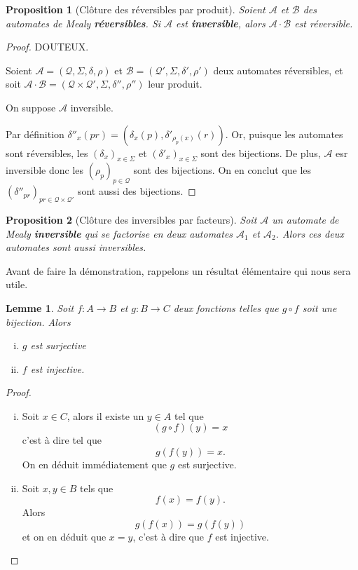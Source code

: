 \documentclass[11pt,a4paper]{article}
\newtheorem{prop}{Proposition}
\newtheorem{lemma}{Lemme}
\begin{document}
\begin{prop}[Clôture des réversibles par produit]
  Soient $\mathcal{A}$ et $\mathcal{B}$ des automates de Mealy \textbf{réversibles}. Si $\mathcal{A}$ est \textbf{inversible}, alors $\mathcal{A}\cdot\mathcal{B}$ est réversible.
\end{prop}

\begin{proof}
  DOUTEUX.


  Soient $\mathcal{A}=\left(\mathcal{Q}, \Sigma, \delta, \rho\right)$ et $\mathcal{B}=\left(\mathcal{Q'}, \Sigma, \delta', \rho'\right)$ deux automates réversibles, et soit $\mathcal{A\cdot B}=\left(\mathcal{Q\times Q'}, \Sigma, \delta'', \rho''\right)$ leur produit.


  On suppose $\mathcal{A}$ inversible.


  Par définition $\delta''_x(pr)=(\delta_x(p), \delta'_{\rho_p(x)}(r))$. Or, puisque les automates sont réversibles, les $(\delta_x)_{x\in\Sigma}$ et ${(\delta'_x)}_{x\in\Sigma}$ sont des bijections. De plus, $\mathcal{A}$ esr inversible donc les ${(\rho_p)}_{p\in \mathcal{Q}}$ sont des bijections. On en conclut que les ${(\delta''_{pr})}_{pr\in\mathcal{Q}\times\mathcal{Q'}}$ sont aussi des bijections.
\end{proof}

\begin{prop}[Clôture des inversibles par facteurs]\label{prop_cloture_inv_facteurs}
  Soit $\mathcal{A}$ un automate de Mealy \textbf{inversible} qui se factorise en deux automates $\mathcal{A}_1$ et $\mathcal{A}_2$. Alors ces deux automates sont aussi inversibles.
\end{prop}

Avant de faire la démonstration, rappelons un résultat élémentaire qui nous sera utile.
\begin{lemma}\label{lem:bij}
  Soit $f:A\rightarrow B$ et $g:B\rightarrow C$ deux fonctions telles que $g\circ f$ soit une bijection.
  Alors
  \begin{enumerate}[(i)]
  \item $g$ est surjective
  \item $f$ est injective.
  \end{enumerate}
\end{lemma}

\begin{proof}
  \begin{enumerate}[(i)]
  \item Soit $x\in C$, alors il existe un $y\in A$ tel que
    \[ (g\circ f)(y) = x \]
    c'est à dire tel que
    \[ g(f(y)) = x. \]
    On en déduit immédiatement que $g$ est surjective.

  \item Soit $x,y \in B$ tels que \[ f(x) = f(y). \] Alors \[ g(f(x)) = g(f(y)) \] et on en déduit que $x = y$, c'est à dire que $f$ est injective.
  \end{enumerate}
\end{proof}
\end{document}
